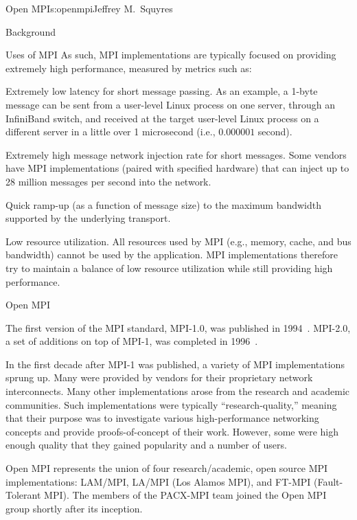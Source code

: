\begin{aosachapter}{Open MPI}{s:openmpi}{Jeffrey M.\ Squyres}
\begin{aosasect1}{Background}
\begin{aosasect2}{Uses of MPI}
As such, MPI implementations are typically focused on providing
extremely high performance, measured by metrics such as:

\begin{aosaitemize}
\item Extremely low latency for short message passing.  As an example,
  a 1-byte message can be sent from a user-level Linux process on one
  server, through an InfiniBand switch, and received at the target
  user-level Linux process on a different server in a little over 1
  microsecond (i.e., $0.000001$ second).
\item Extremely high message network injection rate for short
  messages.  Some vendors have MPI implementations (paired with
  specified hardware) that can inject up to 28 million messages per
  second into the network.
\item Quick ramp-up (as a function of message size) to the maximum
  bandwidth supported by the underlying transport.
\item Low resource utilization.  All resources used by MPI (e.g.,
  memory, cache, and bus bandwidth) cannot be used by the application.
  MPI implementations therefore try to maintain a balance of low
  resource utilization while still providing high performance.
\end{aosaitemize}

\end{aosasect2}


\begin{aosasect2}{Open MPI}

The first version of the MPI standard, MPI-1.0, was published in
1994~\cite{bib:mpi-forum-93}.  
MPI-2.0, a set of additions on top of MPI-1, was completed in
1996~\cite{bib:mpi-geist-96}.

In the first decade after MPI-1 was published, a variety of MPI
implementations sprung up.  Many were provided by vendors for their
proprietary network interconnects.  Many other implementations arose
from the research and academic communities.  Such implementations were
typically ``research-quality,'' meaning that their purpose was to
investigate various high-performance networking concepts and provide
proofs-of-concept of their work.  However, some were high enough
quality that they gained popularity and a number of users.

Open MPI represents the union of four research/academic, open source
MPI implementations: LAM/MPI, LA/MPI (Los Alamos MPI), and FT-MPI
(Fault-Tolerant MPI).
%
The members of the PACX-MPI team joined the Open MPI group shortly
after its inception.


\end{aosasect2}
\end{aosasect1}
\end{aosachapter}
